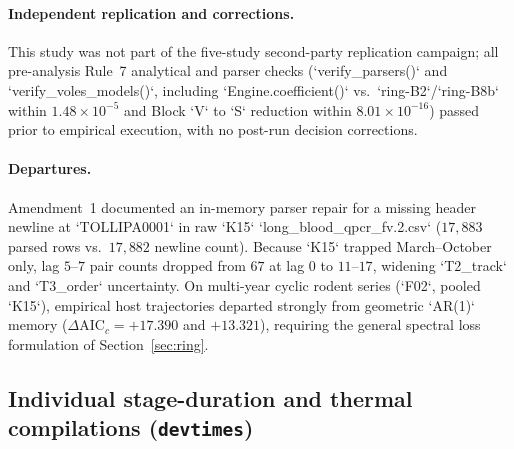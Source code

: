 \paragraph{Independent replication and corrections.}
This study was not part of the five-study second-party replication campaign; all pre-analysis Rule~7 analytical and parser checks (`verify\_parsers()` and `verify\_voles\_models()`, including `Engine.coefficient()` vs.\ `ring-B2`/`ring-B8b` within $1.48 \times 10^{-5}$ and Block `V` to `S` reduction within $8.01 \times 10^{-16}$) passed prior to empirical execution, with no post-run decision corrections.

\paragraph{Departures.}
Amendment~1 documented an in-memory parser repair for a missing header newline at `TOLLIPA0001` in raw `K15` `long\_blood\_qpcr\_fv.2.csv` ($17{,}883$ parsed rows vs.\ $17{,}882$ newline count). Because `K15` trapped March--October only, lag $5$--$7$ pair counts dropped from $67$ at lag $0$ to $11$--$17$, widening `T2\_track` and `T3\_order` uncertainty. On multi-year cyclic rodent series (`F02`, pooled `K15`), empirical host trajectories departed strongly from geometric `AR(1)` memory ($\Delta\mathrm{AIC}_c = +17.390$ and $+13.321$), requiring the general spectral loss formulation of Section~\ref{sec:ring}.

\subsection{Individual stage-duration and thermal compilations (\texttt{devtimes})}\label{num-esm-casestudy-devtimes}

